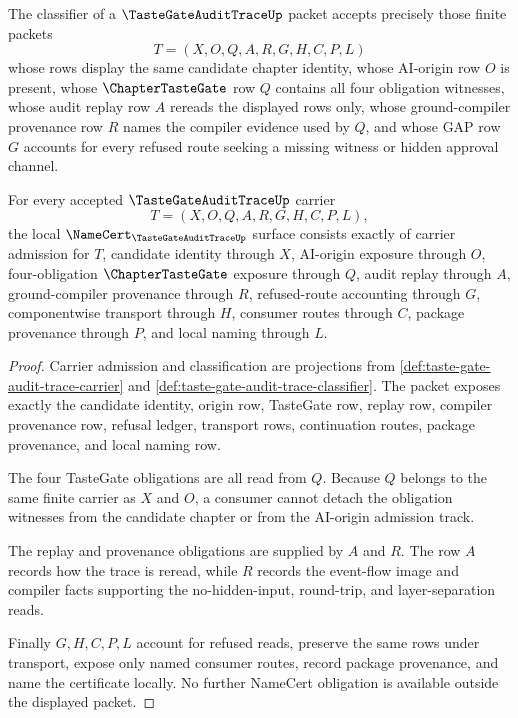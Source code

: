 \begin{definition}
\label{def:taste-gate-audit-trace-classifier}
The classifier of a $\TasteGateAuditTraceUp$ packet accepts precisely those finite packets
$$
T=(X,O,Q,A,R,G,H,C,P,L)
$$
whose rows display the same candidate chapter identity, whose AI-origin row $O$ is present, whose $\ChapterTasteGate$ row $Q$ contains all four obligation witnesses, whose audit replay row $A$ rereads the displayed rows only, whose ground-compiler provenance row $R$ names the compiler evidence used by $Q$, and whose GAP row $G$ accounts for every refused route seeking a missing witness or hidden approval channel.
\end{definition}

\begin{theorem}
\label{thm:taste-gate-audit-trace-namecert-obligations}
For every accepted $\TasteGateAuditTraceUp$ carrier
$$
T=(X,O,Q,A,R,G,H,C,P,L),
$$
the local $\NameCert_{\TasteGateAuditTraceUp}$ surface consists exactly of carrier admission for $T$, candidate identity through $X$, AI-origin exposure through $O$, four-obligation $\ChapterTasteGate$ exposure through $Q$, audit replay through $A$, ground-compiler provenance through $R$, refused-route accounting through $G$, componentwise transport through $H$, consumer routes through $C$, package provenance through $P$, and local naming through $L$.
\end{theorem}
\begin{proof}
Carrier admission and classification are projections from \autoref{def:taste-gate-audit-trace-carrier} and \autoref{def:taste-gate-audit-trace-classifier}. The packet exposes exactly the candidate identity, origin row, TasteGate row, replay row, compiler provenance row, refusal ledger, transport rows, continuation routes, package provenance, and local naming row.

The four TasteGate obligations are all read from $Q$. Because $Q$ belongs to the same finite carrier as $X$ and $O$, a consumer cannot detach the obligation witnesses from the candidate chapter or from the AI-origin admission track.

The replay and provenance obligations are supplied by $A$ and $R$. The row $A$ records how the trace is reread, while $R$ records the event-flow image and compiler facts supporting the no-hidden-input, round-trip, and layer-separation reads.

Finally $G,H,C,P,L$ account for refused reads, preserve the same rows under transport, expose only named consumer routes, record package provenance, and name the certificate locally. No further NameCert obligation is available outside the displayed packet.
\end{proof}

